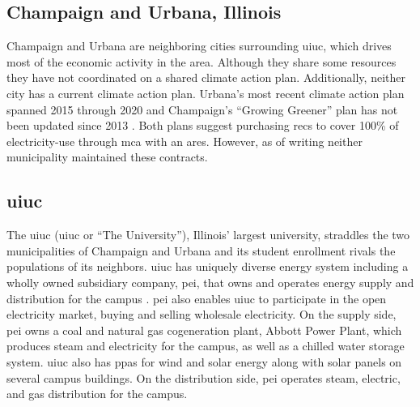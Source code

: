 \subsection{Champaign and Urbana, Illinois}
Champaign and Urbana are neighboring cities surrounding \ac{uiuc}, which drives
most of the economic activity in the area. Although they share some resources
they have not coordinated on a shared climate action plan. Additionally, neither
city has a current climate action plan. Urbana's most recent climate action plan
spanned 2015 through 2020 \cite{ryan_climate_2014} and Champaign's ``Growing
Greener'' plan has not been updated since 2013 \cite{knight_champaign_2013}. Both plans
suggest purchasing \acp{rec} to cover 100\% of electricity-use through \ac{mca} with an
\ac{ares}. However, as of writing neither municipality maintained these contracts.

\subsection{\acf{uiuc}} 

The \acl{uiuc} (\acs{uiuc} or ``The University''), Illinois' largest university,
straddles the two municipalities of Champaign and Urbana and its student
enrollment rivals the populations of its neighbors. \ac{uiuc} has uniquely
diverse energy system including a wholly owned subsidiary company, \ac{pei},
that owns and operates energy supply and distribution for the campus
\cite{affiliated_engineers_inc_utilities_2015}. \ac{pei} also enables \ac{uiuc}
to participate in the open electricity market, buying and selling wholesale
electricity. On the supply side, \ac{pei} owns a coal and natural gas
cogeneration plant, Abbott Power Plant, which produces steam and electricity for
the campus, as well as a chilled water storage system. \ac{uiuc} also has
\acp{ppa} for wind \cite{breitweiser_wind_2016} and solar energy
\cite{white_solar_2017, white_solar_2020} along with solar panels on several
campus buildings. On the distribution side, \ac{pei} operates steam, electric,
and gas distribution for the campus. 


